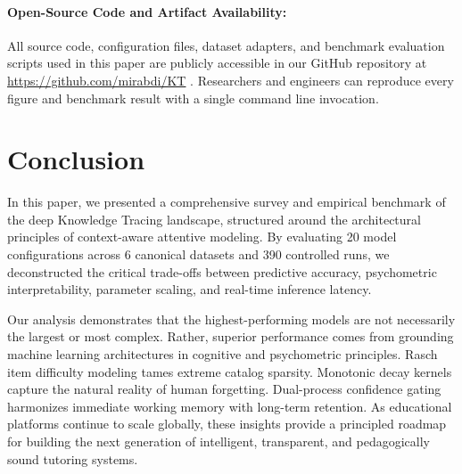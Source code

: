 \documentclass[11pt]{article}
\begin{document}
\paragraph{Open-Source Code and Artifact Availability:}
All source code, configuration files, dataset adapters, and benchmark evaluation scripts used in this paper are publicly accessible in our GitHub repository at \url{https://github.com/mirabdi/KT} \citep{abdimutalipov2024ktbench}. Researchers and engineers can reproduce every figure and benchmark result with a single command line invocation.

\section{Conclusion}
\label{sec:conclusion}

In this paper, we presented a comprehensive survey and empirical benchmark of the deep Knowledge Tracing landscape, structured around the architectural principles of context-aware attentive modeling. By evaluating 20 model configurations across 6 canonical datasets and 390 controlled runs, we deconstructed the critical trade-offs between predictive accuracy, psychometric interpretability, parameter scaling, and real-time inference latency.

Our analysis demonstrates that the highest-performing models are not necessarily the largest or most complex. Rather, superior performance comes from grounding machine learning architectures in cognitive and psychometric principles. Rasch item difficulty modeling tames extreme catalog sparsity. Monotonic decay kernels capture the natural reality of human forgetting. Dual-process confidence gating harmonizes immediate working memory with long-term retention. As educational platforms continue to scale globally, these insights provide a principled roadmap for building the next generation of intelligent, transparent, and pedagogically sound tutoring systems.


\end{document}
